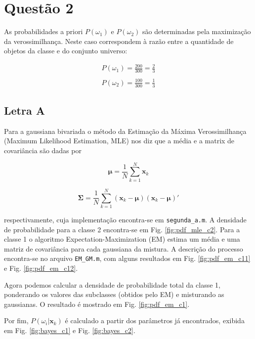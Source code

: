 \documentclass[12pt,twoside]{report}
\newcommand{\figureref}[1]{Fig. \ref{fig:#1}}
\newcommand{\code}[1]{\texttt{#1}}
\begin{document}
\chapter*{Questão 2}

As probabilidades a priori $P(\omega_1)$ e $P(\omega_2)$ são determinadas pela
maximização da verossimilhança. Neste caso correspondem à razão entre a quantidade
de objetos da classe e do conjunto universo:

\begin{equation}
\begin{split}
P(\omega_1) = \frac{200}{300} = \frac{2}{3}\\\\
P(\omega_2) = \frac{100}{300} = \frac{1}{3}
\end{split}
\label{eq:prob_priori}
\end{equation}


\section*{Letra A}

Para a gaussiana bivariada o método da Estimação da Máxima Verossimilhança
(Maximum Likelihood Estimation, MLE) nos diz que a média e a matrix de covariância
são dadas por

\begin{equation}
\mathbf{\mu} = \frac{1}{N} \sum_{k=1}^N \mathbf{x}_k
\label{eq:letra_a_mean}
\end{equation}

\begin{equation}
\mathbf{\Sigma} = \frac{1}{N} \sum_{k=1}^N (\mathbf{x}_k - \mathbf{\mu})(\mathbf{x}_k - \mathbf{\mu})'
\label{eq:letra_a_covariance}
\end{equation}

\noindent respectivamente, cuja implementação encontra-se em \code{segunda\_a.m}.
A densidade de probabilidade para a classe 2 encontra-se em \figureref{pdf_mle_c2}.
Para a classe 1 o algoritmo Expectation-Maximization (EM) estima um média e uma
matriz de covariância para cada gaussiana da mistura. A descrição do processo
encontra-se no arquivo \code{EM\_GM.m}, com alguns resultados em \figureref{pdf_em_c11}
e \figureref{pdf_em_c12}.

Agora podemos calcular a densidade de probabilidade total da classe 1, ponderando
os valores das subclasses (obtidos pelo EM) e misturando as gaussianas. O resultado
é mostrado em \figureref{pdf_em_c1}.

Por fim, $P(\omega_i|\mathbf{x}_k)$ é calculado a partir dos parâmetros já
encontrados, exibida em \figureref{bayes_c1} e \figureref{bayes_c2}.
\end{document}
